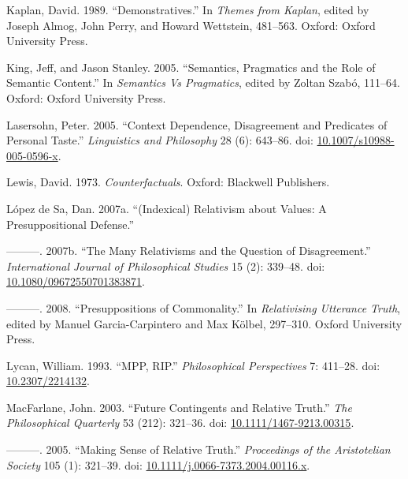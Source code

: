 \documentclass[
  10pt,
  letterpaper,
  DIV=11,
  numbers=noendperiod,
  twoside]{scrartcl}
\newlength{\cslhangindent}
\newenvironment{CSLReferences}[2] %
 {\begin{list}{}{%
  \setlength{\itemindent}{0pt}
  \setlength{\leftmargin}{0pt}
  \setlength{\parsep}{0pt}
  \ifodd #1
   \setlength{\leftmargin}{\cslhangindent}
   \setlength{\itemindent}{-1\cslhangindent}
  \fi
  \setlength{\itemsep}{#2\baselineskip}}}
 {\end{list}}
\begin{document}
\begin{CSLReferences}{1}{0}
Kaplan, David. 1989. {``Demonstratives.''} In \emph{Themes from Kaplan},
edited by Joseph Almog, John Perry, and Howard Wettstein, 481--563.
Oxford: Oxford University Press.

King, Jeff, and Jason Stanley. 2005. {``Semantics, Pragmatics and the
Role of Semantic Content.''} In \emph{Semantics Vs Pragmatics}, edited
by Zoltan Szabó, 111--64. Oxford: Oxford University Press.

Lasersohn, Peter. 2005. {``Context Dependence, Disagreement and
Predicates of Personal Taste.''} \emph{Linguistics and Philosophy} 28
(6): 643--86. doi:
\href{https://doi.org/10.1007/s10988-005-0596-x}{10.1007/s10988-005-0596-x}.

Lewis, David. 1973. \emph{Counterfactuals}. Oxford: Blackwell
Publishers.

López de Sa, Dan. 2007a. {``(Indexical) Relativism about Values: A
Presuppositional Defense.''}

---------. 2007b. {``The Many Relativisms and the Question of
Disagreement.''} \emph{International Journal of Philosophical Studies}
15 (2): 339--48. doi:
\href{https://doi.org/10.1080/09672550701383871}{10.1080/09672550701383871}.

---------. 2008. {``Presuppositions of Commonality.''} In
\emph{Relativising Utterance Truth}, edited by Manuel Garcia-Carpintero
and Max Kölbel, 297--310. Oxford University Press.

Lycan, William. 1993. {``MPP, RIP.''} \emph{Philosophical Perspectives}
7: 411--28. doi:
\href{https://doi.org/10.2307/2214132}{10.2307/2214132}.

MacFarlane, John. 2003. {``{Future Contingents and Relative Truth}.''}
\emph{The Philosophical Quarterly} 53 (212): 321--36. doi:
\href{https://doi.org/10.1111/1467-9213.00315}{10.1111/1467-9213.00315}.

---------. 2005. {``{Making Sense of Relative Truth}.''}
\emph{Proceedings of the Aristotelian Society} 105 (1): 321--39. doi:
\href{https://doi.org/10.1111/j.0066-7373.2004.00116.x}{10.1111/j.0066-7373.2004.00116.x}.


\end{CSLReferences}
\end{document}
